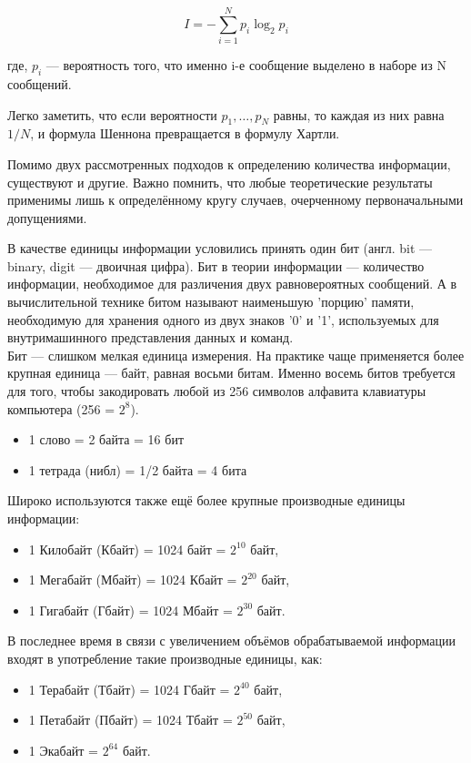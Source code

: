 \documentclass[a4paper]{article}
\begin{document}
\begin{equation}
  I = -\sum_{i=1}^{N}p_{i}\log_{2}p_{i}
\end{equation}

\begin{center}
  где, $p_{i}$ --- вероятность того, что именно i-е сообщение выделено в наборе из N сообщений.
\end{center}

Легко заметить, что если вероятности $p_{1}, \ldots , p_{N}$ равны, то каждая из них равна $1/N$, и формула Шеннона превращается в формулу Хартли.

Помимо двух рассмотренных подходов к определению количества информации, существуют и другие. Важно помнить, что любые теоретические результаты применимы лишь к определённому кругу случаев, очерченному первоначальными допущениями.

В качестве единицы информации условились принять один бит (англ. bit --- binary, digit --- двоичная цифра). Бит в теории информации --- количество информации, необходимое для различения двух равновероятных сообщений. А в вычислительной технике битом называют наименьшую 'порцию' памяти, необходимую для хранения одного из двух знаков '0' и '1', используемых для внутримашинного представления данных и команд.\\
Бит — слишком мелкая единица измерения. На практике чаще применяется более крупная единица — байт, равная восьми битам. Именно восемь битов требуется для того, чтобы закодировать любой из 256 символов алфавита клавиатуры компьютера (256 = $2^{8}$).

\begin{itemize}
  \item 1 слово = 2 байта = 16 бит
  \item 1  тетрада (нибл) = 1/2 байта = 4 бита
\end{itemize}

Широко используются также ещё более крупные производные единицы информации:
\begin{itemize}
  \item 1 Килобайт (Кбайт) = 1024 байт = $2^{10}$ байт,
  \item 1 Мегабайт (Мбайт) = 1024 Кбайт = $2^{20}$ байт,
  \item 1 Гигабайт (Гбайт) = 1024 Мбайт = $2^{30}$ байт.
\end{itemize}

В последнее время в связи с увеличением объёмов обрабатываемой информации входят в употребление такие производные единицы, как:
\begin{itemize}
  \item 1 Терабайт (Тбайт) = 1024 Гбайт = $2^{40}$ байт,
  \item 1 Петабайт (Пбайт) = 1024 Тбайт = $2^{50}$ байт,
  \item 1 Экабайт = $2^{64}$ байт.
\end{itemize}
\end{document}
